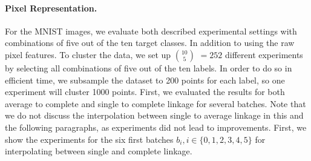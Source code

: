 \paragraph{Pixel Representation.} For the MNIST images, we evaluate both described experimental settings with combinations of five out of the ten target classes. In addition to using the raw pixel features. To cluster the data, we set up $10 \choose 5$ $= 252$ different experiments by selecting all combinations of five out of the ten labels. In order to do so in efficient time, we subsample the dataset to 200 points for each label, so one experiment will cluster 1000 points. First, we evaluated the results for both average to complete and single to complete linkage for several batches. Note that we do not discuss the interpolation between single to average linkage in this and the following paragraphs, as experiments did not lead to improvements. First, we show the experiments for the six first batches $b_i, i \in \{0, 1, 2, 3, 4, 5\}$ for interpolating between single and complete linkage.

